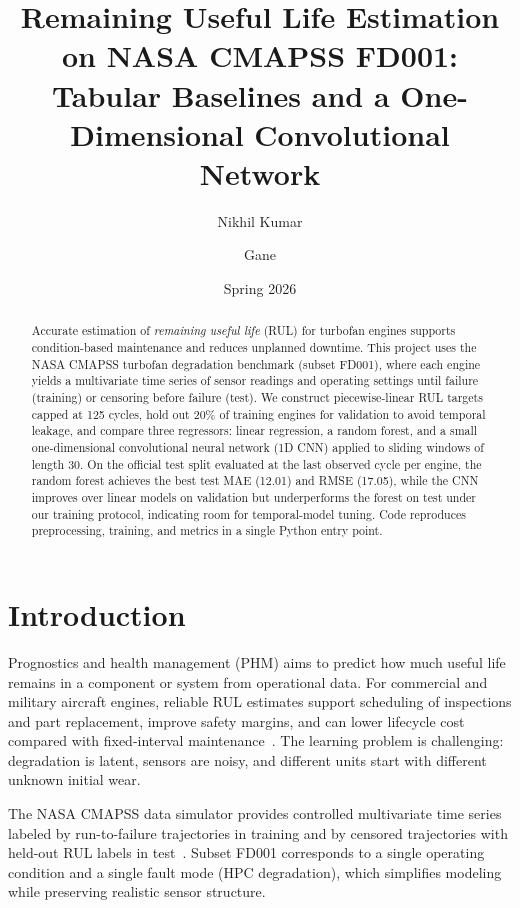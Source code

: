 \documentclass[11pt]{article}
\title{Remaining Useful Life Estimation on NASA CMAPSS FD001:\\
Tabular Baselines and a One-Dimensional Convolutional Network}
\author{Nikhil Kumar \and Gane}
\date{Spring 2026}
\begin{document}
\maketitle

\begin{abstract}
Accurate estimation of \emph{remaining useful life} (RUL) for turbofan engines supports condition-based maintenance and reduces unplanned downtime. This project uses the NASA CMAPSS turbofan degradation benchmark (subset FD001), where each engine yields a multivariate time series of sensor readings and operating settings until failure (training) or censoring before failure (test). We construct piecewise-linear RUL targets capped at 125 cycles, hold out 20\% of training engines for validation to avoid temporal leakage, and compare three regressors: linear regression, a random forest, and a small one-dimensional convolutional neural network (1D CNN) applied to sliding windows of length 30. On the official test split evaluated at the last observed cycle per engine, the random forest achieves the best test MAE (12.01) and RMSE (17.05), while the CNN improves over linear models on validation but underperforms the forest on test under our training protocol, indicating room for temporal-model tuning. Code reproduces preprocessing, training, and metrics in a single Python entry point.
\end{abstract}

\section{Introduction}

Prognostics and health management (PHM) aims to predict how much useful life remains in a component or system from operational data. For commercial and military aircraft engines, reliable RUL estimates support scheduling of inspections and part replacement, improve safety margins, and can lower lifecycle cost compared with fixed-interval maintenance~\cite{saxena2008damage}. The learning problem is challenging: degradation is latent, sensors are noisy, and different units start with different unknown initial wear.

The NASA CMAPSS data simulator provides controlled multivariate time series labeled by run-to-failure trajectories in training and by censored trajectories with held-out RUL labels in test~\cite{saxena2008damage}. Subset FD001 corresponds to a single operating condition and a single fault mode (HPC degradation), which simplifies modeling while preserving realistic sensor structure.
\end{document}
